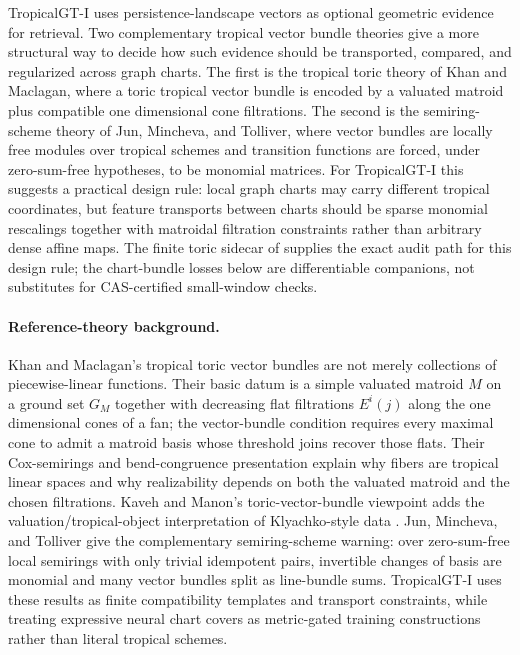 \documentclass[11pt]{article}
\begin{document}
TropicalGT-I uses persistence-landscape vectors as optional geometric evidence for retrieval.  Two complementary tropical vector bundle theories give a more structural way to decide how such evidence should be transported, compared, and regularized across graph charts.  The first is the tropical toric theory of Khan and Maclagan, where a toric tropical vector bundle is encoded by a valuated matroid plus compatible one dimensional cone filtrations.  The second is the semiring-scheme theory of Jun, Mincheva, and Tolliver, where vector bundles are locally free modules over tropical schemes and transition functions are forced, under zero-sum-free hypotheses, to be monomial matrices.  For TropicalGT-I this suggests a practical design rule: local graph charts may carry different tropical coordinates, but feature transports between charts should be sparse monomial rescalings together with matroidal filtration constraints rather than arbitrary dense affine maps.  The finite toric sidecar of  supplies the exact audit path for this design rule; the chart-bundle losses below are differentiable companions, not substitutes for CAS-certified small-window checks.

\paragraph{Reference-theory background.}
Khan and Maclagan's tropical toric vector bundles are not merely collections of piecewise-linear functions.  Their basic datum is a simple valuated matroid $M$ on a ground set $G_M$ together with decreasing flat filtrations $E^i(j)$ along the one dimensional cones of a fan; the vector-bundle condition requires every maximal cone to admit a matroid basis whose threshold joins recover those flats.  Their Cox-semirings and bend-congruence presentation explain why fibers are tropical linear spaces and why realizability depends on both the valuated matroid and the chosen filtrations.  Kaveh and Manon's toric-vector-bundle viewpoint adds the valuation/tropical-object interpretation of Klyachko-style data \cite{kavehmanon2023toricbundles}.  Jun, Mincheva, and Tolliver give the complementary semiring-scheme warning: over zero-sum-free local semirings with only trivial idempotent pairs, invertible changes of basis are monomial and many vector bundles split as line-bundle sums.  TropicalGT-I uses these results as finite compatibility templates and transport constraints, while treating expressive neural chart covers as metric-gated training constructions rather than literal tropical schemes.
\end{document}
